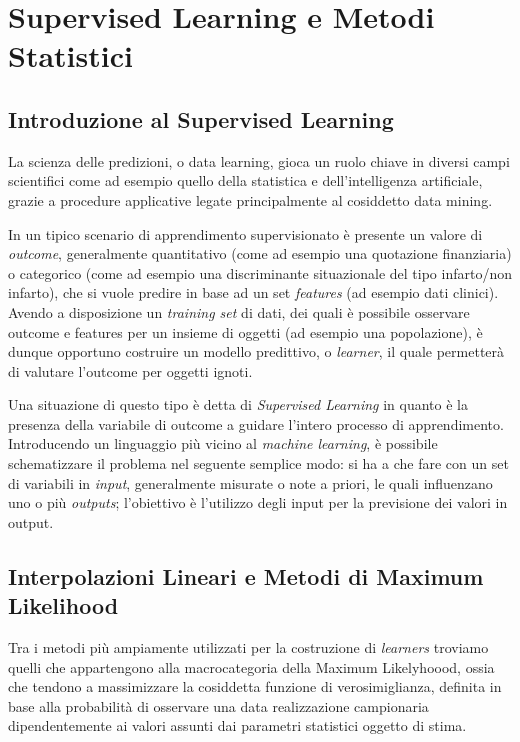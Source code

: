 \documentclass[a4paper]{report}
\begin{document}
\chapter{Supervised Learning e Metodi Statistici}

\section{Introduzione al Supervised Learning}
La scienza delle predizioni, o data learning, gioca un ruolo chiave in diversi campi scientifici come ad esempio quello della statistica e dell'intelligenza artificiale, grazie a procedure applicative legate principalmente al cosiddetto data mining.

In un tipico scenario di apprendimento supervisionato è presente un valore di \textit{outcome}, generalmente quantitativo (come ad esempio una quotazione finanziaria) o categorico (come ad esempio una discriminante situazionale del tipo infarto/non infarto), che si vuole predire in base ad un set \textit{features} (ad esempio dati clinici).
Avendo a disposizione un \textit{training set} di dati, dei quali è possibile osservare outcome e features per un insieme di oggetti (ad esempio una popolazione), è dunque opportuno costruire un modello predittivo, o \textit{learner}, il quale permetterà di valutare l'outcome per oggetti ignoti.

Una situazione di questo tipo è detta di \textit{Supervised Learning} in quanto è la presenza della variabile di outcome a guidare l'intero processo di apprendimento.
Introducendo un linguaggio più vicino al \textit{machine learning}, è possibile schematizzare il problema nel seguente semplice modo: si ha a che fare con un set di variabili in \textit{input}, generalmente misurate o note a priori, le quali influenzano uno o più \textit{outputs}; l'obiettivo è l'utilizzo degli input per la previsione dei valori in output.

\section{Interpolazioni Lineari e Metodi di Maximum Likelihood}
Tra i metodi più ampiamente utilizzati per la costruzione di \textit{learners} troviamo quelli che appartengono alla macrocategoria della Maximum Likelyhoood, ossia che tendono a massimizzare la cosiddetta funzione di verosimiglianza, definita in base alla probabilità di osservare una data realizzazione campionaria dipendentemente ai valori assunti dai parametri statistici oggetto di stima.
\end{document}
